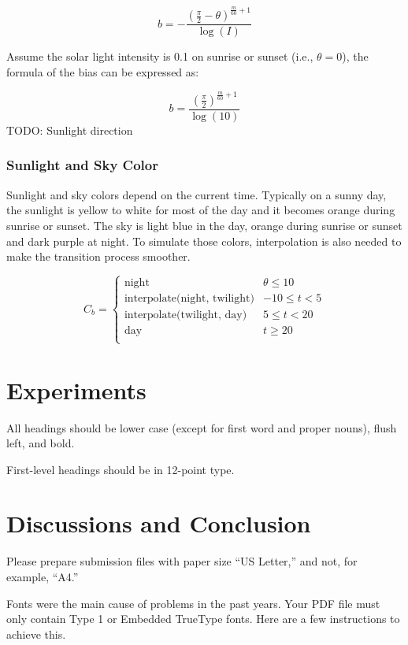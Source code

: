 \documentclass{article}
\begin{document}
\[
  b = -\frac{\left(\frac{\pi}{2} - \theta\right)^{\frac{m}{60} + 1}}{\log(I)}
\]

Assume the solar light intensity is 0.1 on sunrise or sunset (i.e., \( \theta=0\)), the formula 
of the bias can be expressed as:

\[
  b = \frac{\left(\frac{\pi}{2}\right)^{\frac{m}{60} + 1}}{\log(10)}
\]
TODO: Sunlight direction

\subsubsection {Sunlight and Sky Color}
Sunlight and sky colors depend on the current time. Typically on a sunny day, the sunlight is yellow
to white for most of the day and it becomes orange during sunrise or sunset. The sky is light blue
in the day, orange during sunrise or sunset and dark purple at night. To simulate those colors, 
interpolation is also needed to make the transition process smoother. 

\[
  C_{b}=
  \left\{
    \begin{array}{ll}
      \text{night} & \theta \leq 10 \\
      \text{interpolate(night, twilight)} &  -10 \leq t < 5 \\
      \text{interpolate(twilight, day)} &  5 \leq t < 20 \\
      \text{day} & t \geq 20 \\
    \end{array} 
  \right. 
\]


\section{Experiments}
\label{headings}


All headings should be lower case (except for first word and proper nouns),
flush left, and bold.


First-level headings should be in 12-point type.



\section{Discussions and Conclusion}


Please prepare submission files with paper size ``US Letter,'' and not, for
example, ``A4.''


Fonts were the main cause of problems in the past years. Your PDF file must only
contain Type 1 or Embedded TrueType fonts. Here are a few instructions to
achieve this.
\end{document}
